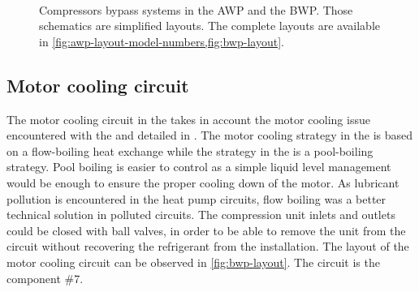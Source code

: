 \begin{figure}[htbp]
  \centering
  \begin{minipage}[r]{0.5\linewidth}
    \begin{flushright}
      \\
    \end{flushright}
  \end{minipage} \hfill
  \begin{minipage}[l]{0.48\linewidth}
    \begin{flushleft}
    \end{flushleft}
  \end{minipage}
  \caption[Compressors bypass systems in the AWP and the
  BWP]{Compressors bypass systems in the AWP and the BWP. Those
    schematics are simplified layouts. The complete layouts are
    available in \cref{fig:awp-layout-model-numbers,fig:bwp-layout}.}
  \label{fig:bypass-schematics}
\end{figure}

\subsection{Motor cooling circuit}
\label{sec:bwp-motor-cooling}

The motor cooling circuit in the \BWP{} takes in account the motor
cooling issue encountered with the \AWP{} and detailed in
. The motor cooling strategy in the
\BWP{} is based on a flow-boiling heat exchange while the strategy in
the \AWP{} is a pool-boiling strategy. Pool boiling is easier to
control as a simple liquid level management would be enough to ensure
the proper cooling down of the motor. As lubricant pollution is
encountered in the heat pump circuits, flow
boiling was a better technical solution in polluted
circuits. The compression unit inlets
and outlets could be closed with ball valves, in order to be able to
remove the unit from the circuit without recovering the refrigerant
from the installation. The layout of the motor cooling circuit can be
observed in \cref{fig:bwp-layout}. The circuit is the component \#7.

